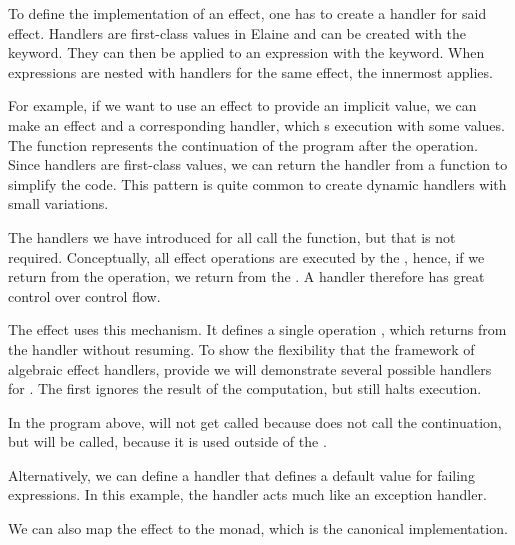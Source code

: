 To define the implementation of an effect, one has to create a handler for said effect. Handlers are first-class values in Elaine and can be created with the  keyword. They can then be applied to an expression with the  keyword. When  expressions are nested with handlers for the same effect, the innermost  applies.

For example, if we want to use an effect to provide an implicit value, we can make an effect  and a corresponding handler, which s execution with some values. The  function represents the continuation of the program after the operation. Since handlers are first-class values, we can return the handler from a function to simplify the code. This pattern is quite common to create dynamic handlers with small variations.



The handlers we have introduced for  all call the  function, but that is not required. Conceptually, all effect operations are executed by the , hence, if we return from the operation, we return from the . A handler therefore has great control over control flow.

The  effect uses this mechanism. It defines a single operation , which returns from the handler without resuming. To show the flexibility that the framework of algebraic effect handlers, provide we will demonstrate several possible handlers for . The first ignores the result of the computation, but still halts execution.



In the program above,  will not get called because  does not call the continuation, but  will be called, because it is used outside of the .

Alternatively, we can define a handler that defines a default value for failing expressions. In this example, the handler acts much like an exception handler.



We can also map the  effect to the  monad, which is the canonical implementation.

